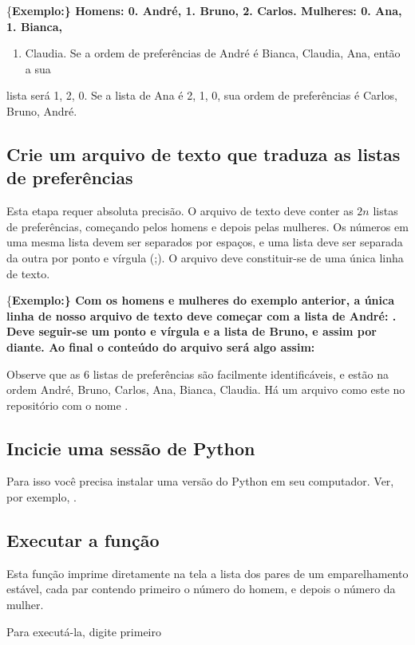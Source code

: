 \documentclass[11pt]{article}
\begin{document}
\{\bf Exemplo:\} Homens: 0. André, 1. Bruno, 2. Carlos. Mulheres: 0. Ana, 1. Bianca,
\begin{enumerate}
\item Claudia. Se a ordem de preferências de André é Bianca, Claudia, Ana, então a sua
\end{enumerate}
lista será 1, 2, 0. Se a lista de Ana é 2, 1, 0, sua ordem de preferências é Carlos,
Bruno, André.
\subsection{Crie um arquivo de texto que traduza as listas de preferências}
\label{sec-3-2}

Esta etapa requer absoluta precisão. O arquivo de texto deve conter as $2n$ listas de
preferências, começando pelos homens e depois pelas mulheres. Os números em uma mesma
lista devem ser separados por espaços, e uma lista deve ser separada da outra por
ponto e vírgula (;). O arquivo deve constituir-se de uma única linha de texto.

\{\bf Exemplo:\} Com os homens e mulheres do exemplo anterior, a única linha
de nosso arquivo de texto deve começar com a lista de André: . Deve
seguir-se um ponto e vírgula e a lista de Bruno, e assim por diante. Ao final o
conteúdo do arquivo será algo assim:


Observe que as $6$ listas de preferências são facilmente identificáveis, e estão
na ordem André, Bruno, Carlos, Ana, Bianca, Claudia. Há um arquivo como este no
repositório com o nome .
\subsection{Incicie uma sessão de Python}
\label{sec-3-3}

Para isso você precisa instalar uma versão do Python em seu computador. Ver, 
por exemplo, .
\subsection{Executar a função }
\label{sec-3-4}

Esta função imprime diretamente na tela a lista dos pares de um emparelhamento
estável, cada par contendo primeiro o número do homem, e depois o número da mulher.

Para executá-la, digite primeiro
\end{document}
